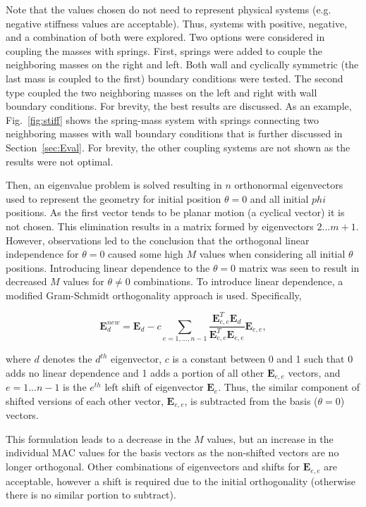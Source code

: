 \documentclass[3p,times]{elsarticle}
\begin{document}
Note that the values chosen do not need to represent physical systems (e.g. negative stiffness values are acceptable).  Thus, systems with positive, negative, and a combination of both were explored.  Two options were considered in coupling the masses with springs.  First, springs were added to couple the neighboring masses on the right and left.  
Both wall and cyclically symmetric (the last mass is coupled to the first) boundary conditions were tested.  The second type coupled the two neighboring masses on the left and right with wall
boundary conditions.
For brevity, the best results are discussed.
As an example, Fig.~\ref{fig:stiff} shows the spring-mass system with springs connecting two neighboring masses with wall boundary conditions
that is further discussed in Section~\ref{sec:Eval}.  For brevity, the other coupling systems are not shown as the results were not optimal.

Then, an eigenvalue problem is solved resulting in $n$ orthonormal eigenvectors used to represent the geometry for initial position $\theta=0$ and all initial $phi$ positions.  
As the first vector tends to be planar motion (a cyclical vector) it is not chosen.  
This elimination results in a matrix formed by eigenvectors $2...m+1$.  
However, observations led to the conclusion that the orthogonal linear independence for $\theta=0$ caused some high $M$ values when considering all initial $\theta$ positions.  
Introducing linear dependence to the $\theta=0$ matrix was seen to result in decreased $M$ values for $\theta\neq 0$ combinations.  
To introduce linear dependence, a modified Gram-Schmidt orthogonality approach is used.  Specifically, 

\begin{equation}
\mathbf{E}^{new}_{d}=\mathbf{E}_{d}- c \sum_{e=1,...,n-1} \frac{\mathbf{E}_{e,e}^T \mathbf{E}_{d}}{\mathbf{E}_{e,e}^T \mathbf{E}_{e,e}}\mathbf{E}_{e,e},
\label{eq:GS}
\end{equation}

\noindent where $d$ denotes the $d^{th}$ eigenvector, $c$ is a constant between 0 and 1 such that 0 adds no linear dependence and 1 adds a portion of all other $\mathbf{E}_{e,e}$ vectors, and $e=1...n-1$ is the $e^{th}$ left shift of eigenvector $\mathbf{E}_e$. 
Thus, the similar component of shifted versions of each other vector, $\mathbf{E}_{e,e}$, is subtracted from the basis ($\theta=0$) vectors. 

This formulation leads to a decrease in the $M$ values, but an increase in the individual MAC values for the basis vectors as the non-shifted vectors are no longer orthogonal.
Other combinations of eigenvectors and shifts for $\mathbf{E}_{e,e}$ are acceptable, however a shift is required due to the initial orthogonality (otherwise there is no similar portion to subtract).
\end{document}
